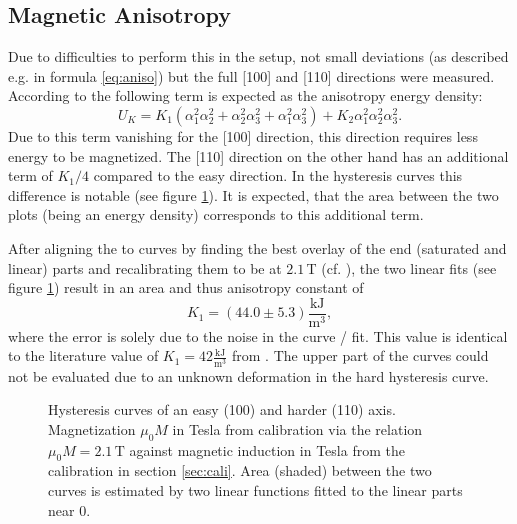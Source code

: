 \documentclass[a4paper]{scrartcl}
\numberwithin{equation}{section}
\numberwithin{figure}{section}
\numberwithin{table}{section}
\newcommand{\eq}[2]{\begin{equation}#1\label{#2}\end{equation}}
\begin{document}
\subsection{Magnetic Anisotropy}
Due to difficulties to perform this in the setup, not small deviations (as described e.g. in formula \ref{eq:aniso}) but the full [100] and [110] directions were measured. According to \cite{kittel} the following term is expected as the anisotropy energy density:
\eq{U_K=K_1(\alpha_1^2\alpha_2^2 + \alpha_2^2\alpha_3^2 + \alpha_1^2\alpha_3^2) + K_2\alpha_1^2\alpha_2^2\alpha_3^2 .}{}
Due to this term vanishing for the [100] direction, this direction requires less energy to be magnetized. The [110] direction on the other hand has an additional term of $K_1 / 4$ compared to the easy direction. In the hysteresis curves this difference is notable (see figure \ref{fig:ani}). It is expected, that the area between the two plots (being an energy density) corresponds to this additional term.

After aligning the to curves by finding the best overlay of the end (saturated and linear) parts and recalibrating them to be at $2.1\,$T (cf. \cite{skript}), the two linear fits (see figure \ref{fig:ani}) result in an area and thus anisotropy constant of
\eq{K_1 = (44.0\pm 5.3)\frac{\text{kJ}}{\text{m}^3},}{} 
where the error is solely due to the noise in the curve / fit. This value is identical to the literature value of $K_1=42\frac{\text{kJ}}{\text{m}^3}$ from \cite{kittel}. The upper part of the curves could not be evaluated due to an unknown deformation in the hard hysteresis curve. 
\begin{figure} 
 \centering
{}

\caption{
\small Hysteresis curves of an easy (100) and harder (110) axis. Magnetization $\mu_0 M$ in Tesla from calibration via the relation $\mu_0 M = 2.1\,\text{T}$ against magnetic induction in Tesla from the calibration in section \ref{sec:cali}. Area (shaded) between the two curves is estimated by two linear functions fitted to the linear parts near 0. } 
	\label{fig:ani}
\end{figure}
\end{document}

